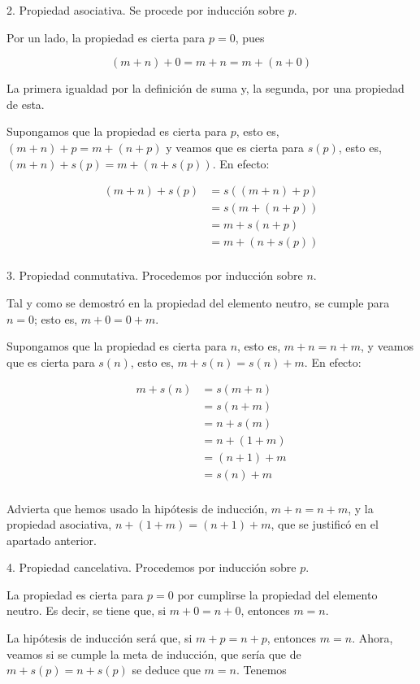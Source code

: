 2. Propiedad asociativa. Se procede por inducción sobre $p$.

Por un lado, la propiedad es cierta para $p = 0$, pues

$$ (m + n) + 0 = m + n = m + (n + 0) $$

\noindent La primera igualdad por la definición de suma y, la segunda, por
una propiedad de esta.

Supongamos que la propiedad es cierta para $p$, esto es, $(m + n) + p = m +
(n + p)$ y veamos que es cierta para $s(p)$, esto es, $(m + n) + s(p) = m +
(n + s(p))$. En efecto:

\begin{align*}
  (m + n) + s(p)
    &= s((m + n) + p) \\
    &= s(m + (n + p)) \\
    &= m + s(n + p) \\
    &= m + (n + s(p)) \\
\end{align*}

3. Propiedad conmutativa. Procedemos por inducción sobre $n$.

Tal y como se demostró en la propiedad del elemento neutro, se cumple para
$n = 0$; esto es, $m + 0 = 0 + m$.

Supongamos que la propiedad es cierta para $n$, esto es, $m + n = n + m$, y
veamos que es cierta para $s(n)$, esto es, $m + s(n) = s(n) + m$. En efecto:

\begin{align*}
  m + s(n)
    &= s(m + n) \\
    &= s(n + m) \\
    &= n + s(m) \\
    &= n + (1 + m) \\
    &= (n + 1) + m \\
    &= s(n) + m \\
\end{align*}

\noindent Advierta que hemos usado la hipótesis de inducción, $m + n = n +
m$, y la propiedad asociativa, $n + (1 + m) = (n + 1) + m$, que se justificó
en el apartado anterior.

4. Propiedad cancelativa. Procedemos por inducción sobre $p$.

La propiedad es cierta para $p = 0$ por cumplirse la propiedad del elemento
neutro. Es decir, se tiene que, si $m + 0 = n + 0$, entonces $m = n$.

La hipótesis de inducción será que, si $m + p = n + p$, entonces $m = n$.
Ahora, veamos si se cumple la meta de inducción, que sería que de $m + s(p)
= n + s(p)$ se deduce que $m = n$. Tenemos

